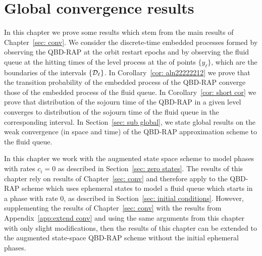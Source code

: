\chapter{Global convergence results}\label{ch: global results}
In this chapter we prove some results which stem from the main results of Chapter~\ref{sec: conv}. We consider the discrete-time embedded processes formed by observing the QBD-RAP at the orbit restart epochs and by observing the fluid queue at the hitting times of the level process at the of points \(\{y_\ell\}\), which are the boundaries of the intervals \(\{\mathcal{D}_\ell\}\). In Corollary~\ref{cor: aln22222212} we prove that the transition probability of the embedded process of the QBD-RAP converge those of the embedded process of the fluid queue. In Corollary~\ref{cor: short cor} we prove that distribution of the sojourn time of the QBD-RAP in a given level converges to distribution of the sojourn time of the fluid queue in the corresponding interval. In Section~\ref{sec: sub global}, we state global results on the weak convergence (in space and time) of the QBD-RAP approximation scheme to the fluid queue. 

In this chapter we work with the augmented state space scheme to model phases with rates \(c_i=0\) as described in Section~\ref{sec: zero states}. The results of this chapter rely on results of Chapter~\ref{sec: conv} and therefore apply to the QBD-RAP scheme which uses ephemeral states to model a fluid queue which starts in a phase with rate \(0\), as described in Section~\ref{sec: initial conditions}. However, supplementing the results of Chapter~\ref{sec: conv} with the results from Appendix~\ref{app:extend conv} and using the same arguments from this chapter with only slight modifications, then the results of this chapter can be extended to the augmented state-space QBD-RAP scheme without the initial ephemeral phases. 

